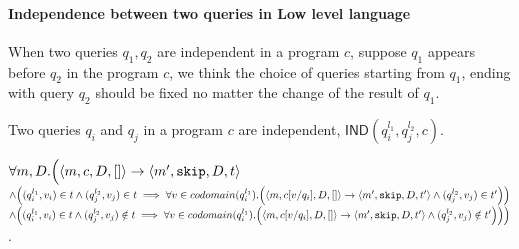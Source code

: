 \documentclass[a4paper,11pt]{article}
\begin{document}
\paragraph{Independence between two queries in Low level language}
%
When two queries $q_1,q_2$ are independent in a program $c$, suppose $q_1$ appears before $q_2$ in the program $c$, we think the choice of queries starting from $q_1$, ending with query $q_2$ should be fixed no matter the change of the result of $q_1$.\\
%
\begin{defn}
Two queries $q_i$ and $q_j$ in a program $c$ are independent, $\mathsf{IND}(q^{l_1}_i, q^{l_2}_j, c)$.

$\forall m, D. 
\Big( 
\langle m, c, D, [] \rangle \rightarrow \langle m', \mathtt{skip}, D, t \rangle 
$\\
$\land 
\left((q^{l_1}_i, v_i) \in t \land (q^{l_2}_j, v_j) \in t  \implies \forall v \in codomain(q^{l_1}_i). 
\left( \config{m, c[v/q_i], D, []} \rightarrow \config{m', \eskip, D, t'} \land (q^{l_2}_j, v_j) \in t'
\right)
\right)$
\\
$
\land 
\left( (q^{l_1}_i, v_i) \in t \land (q^{l_2}_j, v_j) \notin t  \implies \forall v\in codomain(q^{l_1}_i). 
\left( \config{m, c[v/q_i], D, []} \rightarrow \config{m', \eskip, D, t'} \land (q^{l_2}_j, v_j) \notin t'
\right)
\right)
\Big ) $.
\end{defn}
%
\end{document}
